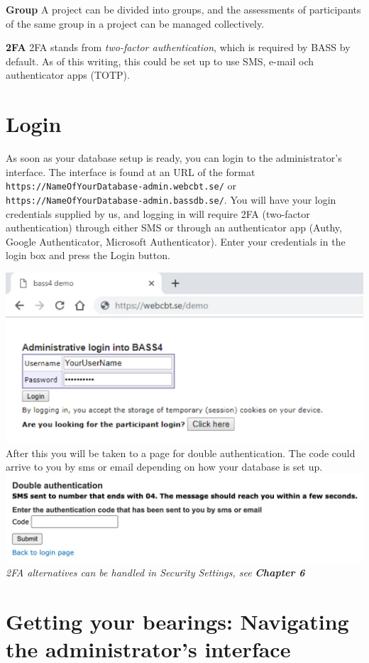 \documentclass[
]{book}
\begin{document}
\textbf{Group}
A project can be divided into groups, and the assessments of participants of the same group in a project can be managed collectively.

\textbf{2FA}
2FA stands from \emph{two-factor authentication}, which is required by BASS by default. As of this writing, this could be set up to use SMS, e-mail och authenticator apps (TOTP).

\chapter{Login}\label{login}

As soon as your database setup is ready, you can login to the administrator's interface. The interface is found at an URL of the format \texttt{https://NameOfYourDatabase-admin.webcbt.se/} or \texttt{https://NameOfYourDatabase-admin.bassdb.se/}.
You will have your login credentials supplied by us, and logging in will require 2FA (two-factor authentication) through either SMS or through an authenticator app (Authy, Google Authenticator, Microsoft Authenticator).
Enter your credentials in the login box and press the Login button.

\includegraphics{images/login.png}
After this you will be taken to a page for double authentication. The code could arrive to you by sms or email depending on how your database is set up.
\includegraphics{images/login_2FA.png}
\emph{2FA alternatives can be handled in Security Settings, see} \textbf{\emph{Chapter 6}}

\chapter{Getting your bearings: Navigating the administrator's interface}\label{getting-your-bearings-navigating-the-administrators-interface}
\end{document}
